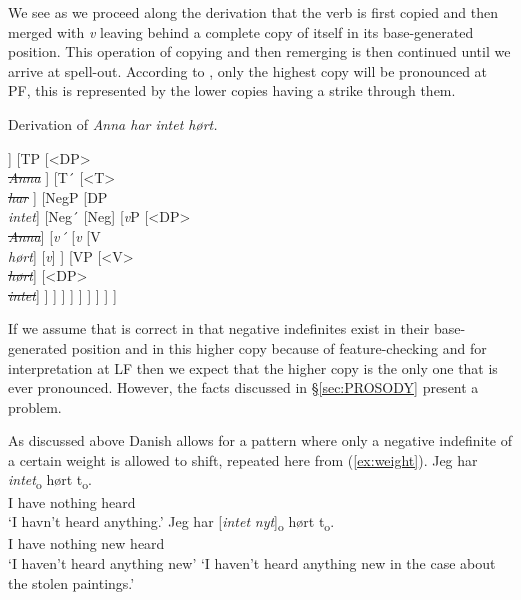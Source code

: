 \documentclass[12pt, letterpaper]{article}
\begin{document}
We see as we proceed along the derivation that the verb is first copied and then merged with \emph{v} leaving behind a complete copy of itself in its base-generated position. This operation of copying and then remerging is then continued until we arrive at spell-out. According to \citet{chomskyMinimalistProgram2015}, only the highest copy will be pronounced at PF, this is represented by the lower copies having a strike through them. 

\ea Derivation of \emph{Anna har intet hørt.} \label{ex:Copy}\\
\begin{forest}
	[CP [DP\\\emph{Anna}] [C´ [C [T\\\emph{har} ] [C] ] [TP [<DP>\\\sout{\emph{Anna}} ] [T´ [<T>\\\sout{\emph{har}} ] [NegP [DP\\\emph{intet}] [Neg´ [Neg] [\emph{v}P [<DP>\\\sout{\emph{Anna}}] [\emph{v´} [\emph{v} [V\\\emph{hørt}] [\emph{v}] ] [VP [<V>\\\emph{\sout{hørt}}] [<DP>\\\sout{\emph{intet}}] ] ] ] ] ] ] ] ] ] 
\end{forest}
\z 

If we assume that \citet{zeijlstraSyntacticallyComplexStatus2011} is correct in that negative indefinites exist in their base-generated position and in this higher copy because of feature-checking and for interpretation at LF then we expect that the higher copy is the only one that is ever pronounced. However, the facts discussed in §\ref{sec:PROSODY} present a problem. 

As discussed above Danish allows for a pattern where only a negative indefinite of a certain weight is allowed to shift, repeated here from (\ref{ex:weight}). 
	\ea
		\ea 
		\gll Jeg har \textit{intet}\textsubscript{o} hørt t\textsubscript{o}.\\
		I have nothing heard\\
		\glt  `I havn't heard anything.'
		\ex 
		\gll Jeg har [\textit{intet} \textit{nyt}]\textsubscript{o} hørt t\textsubscript{o}.\\
		I have nothing new heard\\
		\glt `I haven't heard anything new'
		\glt `I haven't heard anything new in the case about the stolen paintings.'
		\z 
	\z
\end{document}
